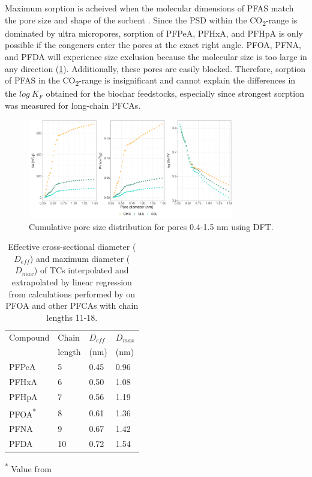 Maximum sorption is acheived when the molecular dimensions of PFAS match the pore size and shape of the sorbent \citep{Hale2016}. Since the PSD within the CO\textsubscript{2}-range is dominated by ultra micropores, sorption of PFPeA, PFHxA, and PFHpA is only possible if the congeners enter the pores at the exact right angle. PFOA, PFNA, and PFDA will experience size exclusion because the molecular size is too large in any direction (\cref{tab:molecsize}). Additionally, these pores are easily blocked. Therefore, sorption of PFAS in the CO\textsubscript{2}-range is insignificant and cannot explain the differences in the $log~K_F$ obtained for the biochar feedstocks, especially since strongest sorption was measured for long-chain PFCAs.

\begin{figure}[htb]
    \centering
    \includegraphics[width=0.8\textwidth]{R/figs/PZD_SAPV_C_small_plot.pdf}
    \caption{Cumulative pore size distribution for pores 0.4-1.5 nm using DFT.}
    \label{fig:PZD_small}
\end{figure}

\begin{table}
\caption{Effective cross-sectional diameter ($D_{eff}$) and maximum diameter ($D_{max}$) of TCs interpolated and extrapolated by linear regression from calculations performed by \cite{inoue2012size} on PFOA and other PFCAs with chain lengths 11-18.}
\centering
\begin{threeparttable}
\label{tab:molecsize}
\begin{tabular}{llll}
\toprule
Compound & Chain & $D_{eff}$ & $D_{max}$ \\ 
& length & (nm) & (nm) \\ \midrule
PFPeA & 5  & 0.45  & 0.96  \\
PFHxA & 6  & 0.50  & 1.08  \\
PFHpA & 7  & 0.56  & 1.19  \\
PFOA\textsuperscript{*} & 8 & 0.61 & 1.36 \\
PFNA & 9 & 0.67 & 1.42  \\
PFDA & 10 & 0.72 & 1.54  \\ \bottomrule                                    
\end{tabular}
\begin{tablenotes}
\item \textsuperscript{*} Value from \cite{inoue2012size}
\end{tablenotes}
\end{threeparttable}
\end{table}

